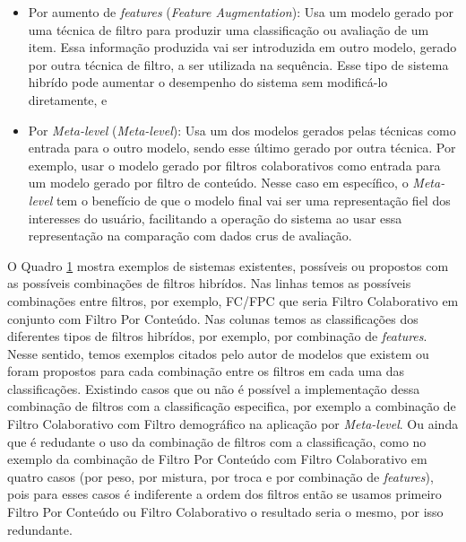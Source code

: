 \begin{itemize}
    \item Por aumento de \textit{features} (\textit{Feature Augmentation}): Usa um modelo gerado por uma técnica de filtro
    para produzir uma classificação ou avaliação de um item. Essa informação produzida vai ser introduzida em outro 
    modelo, gerado por outra técnica de filtro, a ser utilizada na sequência. Esse tipo de
    sistema hibrído pode aumentar o desempenho do sistema sem modificá-lo diretamente, e

    \item Por \textit{Meta-level} (\textit{Meta-level}): Usa um dos modelos gerados pelas técnicas como entrada 
    para o outro modelo, sendo esse último gerado por outra técnica.
    Por exemplo, usar o modelo gerado por filtros colaborativos como entrada para um modelo gerado por filtro de conteúdo.
    Nesse caso em específico, o \textit{Meta-level} tem o benefício de que o modelo final vai ser uma representação fiel
    dos interesses do usuário, facilitando a operação do sistema ao usar essa representação na comparação com dados crus 
    de avaliação.
\end{itemize}

O Quadro \hyperref[tab:1]{1} mostra exemplos de sistemas existentes, possíveis ou propostos com as possíveis combinações de 
filtros hibrídos. Nas linhas temos as possíveis combinações entre filtros, por exemplo, FC/FPC que seria Filtro Colaborativo 
em conjunto com Filtro Por Conteúdo. Nas colunas temos as classificações dos diferentes tipos de filtros hibrídos, por exemplo,
por combinação de \textit{features}. Nesse sentido, temos exemplos citados pelo autor de modelos que existem ou foram propostos
para cada combinação entre os filtros em cada uma das classificações. Existindo casos que ou não é possível a implementação
dessa combinação de filtros com a classificação especifica, por exemplo a combinação de Filtro Colaborativo com Filtro demográfico
na aplicação por \textit{Meta-level}. Ou ainda que é redudante o uso da combinação de filtros com a classificação, como no exemplo
da combinação de Filtro Por Conteúdo com Filtro Colaborativo em quatro casos (por peso, por mistura, por troca e 
por combinação de \textit{features}), pois para esses casos é indiferente a ordem dos filtros então se usamos primeiro Filtro Por Conteúdo
ou Filtro Colaborativo o resultado seria o mesmo, por isso redundante.

